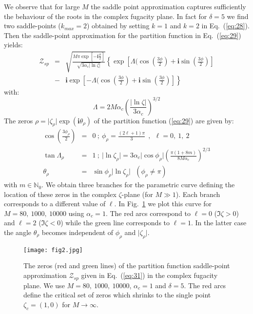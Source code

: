 \documentclass[aps,pre,showpacs,amsmath,amssymb,superscriptaddress,twocolumn]{revtex4-1}
\begin{document}
We observe that for large $M$ the saddle point approximation captures sufficiently the behaviour of the roots in the complex fugacity plane. In fact for $\delta=5$ we find two saddle-points ($k_{max}=2$) obtained by setting $k=1$ and $k=2$ in Eq.~(\ref{eq:28}). Then the saddle-point approximation for the partition function in Eq.~(\ref{eq:29}) yields:
\begin{eqnarray}
\mathcal{Z}_{sp}&=&\sqrt{\frac{M \pi \exp[-\mathbf{i}\frac{\phi}{2}]}{\sqrt{3 \alpha_c \vert \ln \zeta \vert}}} \left\lbrace  \exp[\Lambda (\cos(\frac{3 \phi}{2}) + \mathbf{i} \sin(\frac{3 \phi}{2})] \right.\nonumber \\
&-& \left. \mathbf{i} \exp[-\Lambda (\cos(\frac{3 \phi}{2}) + \mathbf{i} \sin(\frac{3 \phi}{2})]\right\rbrace 
\label{eq:31}
\end{eqnarray}
with:
\begin{equation}
\Lambda=2 M \alpha_c \left(\frac{\vert \ln \zeta \vert}{3 \alpha_c}\right)^{3/2}
\label{eq:32}
\end{equation}
The zeros $\rho=\vert \zeta_{\rho} \vert \exp(\mathbf{i} \theta_{\rho})$ of the partition function (\ref{eq:29}) are given by:
\begin{eqnarray}
\cos(\frac{3 \phi_{\rho}}{2}) &=& 0~;~\phi_{\rho}=\frac{(2 \ell + 1)\pi}{3}~~,~~\ell=0,~1,~2 \nonumber \\
\tan \Lambda_{\rho} &=& 1~;~\vert \ln \zeta_{\rho} \vert = 3 \alpha_c \vert \cos \phi_{\rho} \vert \left(\frac{\pi (1 + 8 m)}{8 M \alpha_c}\right)^{2/3}
\nonumber \\
\theta_{\rho} &=& \sin \phi_{\rho} \vert \ln  \zeta_{\rho} \vert~~~(\phi_{\rho} \neq \pi)
\label{eq:33}
\end{eqnarray}
with $m \in \mathbb{N}_0$. We obtain three branches for the parametric curve defining the location of these zeros in the complex $\zeta$-plane (for $M \gg 1$). Each branch corresponds to a different value of $\ell$. In Fig.~\ref{fig:saddle} we plot this curve for $M=80,~1000,~10000$ using $\alpha_c=1$. The red arcs correspond to $\ell=0$ ($\Im \zeta > 0$) and $\ell=2$ ($\Im \zeta < 0$) while the green line corresponds to $\ell=1$. In the latter case the angle $\theta_{\rho}$ becomes independent of $\phi_{\rho}$ and $\vert \zeta_{\rho} \vert$.  

\begin{figure}[tbp]
\centering
\texttt{[image: fig2.jpg]}
\caption{The zeros (red and green lines) of the partition function saddle-point approximation $\mathcal{Z}_{sp}$ given in Eq.~(\ref{eq:31}) in the complex fugacity plane. We use $M=80,~1000,~10000$, $\alpha_c=1$ and $\delta=5$. The red arcs define the critical set of zeros which shrinks to the single point $\zeta_c=(1,0)$ for $M \to \infty$.}
\label{fig:saddle}
\end{figure}   
\end{document}
